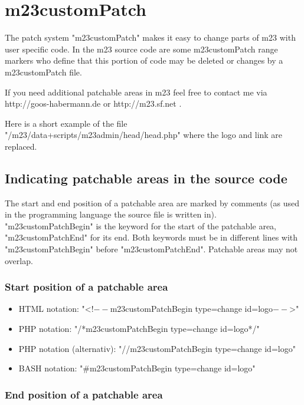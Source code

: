 \chapter{m23customPatch}
\label{m23customPatch}
The patch system "m23customPatch" makes it easy to change parts of m23 with user specific code. In the m23 source code are some m23customPatch range markers who define that this portion of code may be deleted or changes by a m23customPatch file.

If you need additional patchable areas in m23 feel free to contact me via http://goos-habermann.de or http://m23.sf.net .

Here is a short example of the file "/m23/data+scripts/m23admin/head/head.php" where the logo and link are replaced.





\section{Indicating patchable areas in the source code}
The start and end position of a patchable area are marked by comments (as used in the programming language the source file is written in). "m23customPatchBegin" is the keyword for the start of the patchable area, "m23customPatchEnd" for its end. Both keywords must be in different lines with "m23customPatchBegin" before "m23customPatchEnd". Patchable areas may not overlap.

\subsection{Start position of a patchable area}

\begin{itemize}
	\item HTML notation: "<!$--$m23customPatchBegin type=change id=logo$--$>"
	\item PHP notation: "/*m23customPatchBegin type=change id=logo*/"
	\item PHP notation (alternativ): "//m23customPatchBegin type=change id=logo"
	\item BASH notation: "\#m23customPatchBegin type=change id=logo"
\end{itemize}

\subsection{End position of a patchable area}

